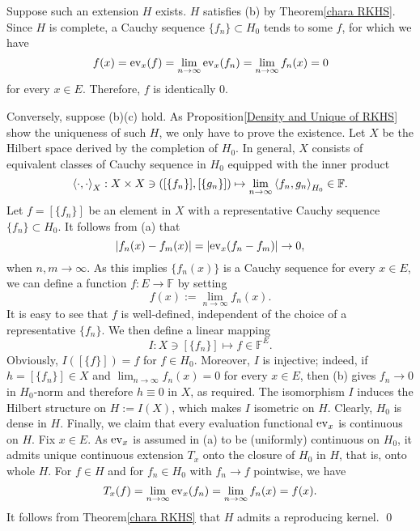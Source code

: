 \documentclass[a4paper,12pt]{article}
\begin{document}
\begin{prf}
	Suppose such an extension \( H \) exists. \( H \) satisfies (b) by Theorem\ref{chara RKHS}.
	Since \( H \) is complete, a Cauchy sequence \( \{f_n\} \subset H_0\) tends to some \( f \), for which we have
	\begin{equation*}
		f(x) = \mathrm{ev}_{x}(f) = \lim_{n \to \infty} \mathrm{ev}_{x}(f_n) = \lim_{n \to \infty} f_n(x) = 0
	\end{equation*}
	for every \( x \in E \). Therefore, \( f \) is identically 0.
	
	Conversely, suppose (b)(c) hold. As Proposition\ref{Density and Unique of RKHS} show the uniqueness of such \( H \), we only have to prove the existence.
	Let \( X \) be the Hilbert space derived by the completion of \( H_0 \).
	In general, \( X \) consists of equivalent classes of Cauchy sequence in \( H_0 \) equipped with the inner product
	\begin{equation*}
		\left<\cdot , \cdot  \right>_X : X \times X \ni \left( [\{f_n\}], [\{g_n\}] \right) \mapsto \lim_{n \to \infty} \left<f_n, g_n \right>_{H_0} \in \mathbb{F}.
	\end{equation*}
	Let \( f = [\{f_n\}] \) be an element in \( X \) with a representative Cauchy sequence \( \{f_n\} \subset H_0 \). It follows from (a) that
	\begin{equation*}
		\left| f_n(x)-f_m(x) \right| = \left| \mathrm{ev}_{x}(f_n-f_m) \right| \to 0,
	\end{equation*}
	when \( n,m \to \infty \).
	As this implies \( \{f_n(x)\} \) is a Cauchy sequence for every \( x \in E \), we can define a function \( f: E \to \mathbb{F} \) by setting
	\begin{equation*}
		f(x) := \lim_{n \to \infty} f_n(x).
	\end{equation*}
	It is easy to see that \( f \) is well-defined, independent of the choice of a representative \( \{f_n\} \). We then define a linear mapping
	\begin{equation*}
		I:X \ni [\{f_n\}] \mapsto f \in \mathbb{F}^E.
	\end{equation*}
	Obviously, \( I([\{f\}]) = f \) for \( f \in  H_0 \). Moreover,
	\( I \) is injective; indeed, if \( h = [\{f_n\}] \in X\) and \( \lim_{n \to \infty} f_n(x)=0 \) for every \( x \in E \), then (b) gives \( f_n \to 0 \) in \( H_0 \)-norm and therefore \( h \equiv 0 \) in \( X \), as required. The isomorphism \( I \) induces the Hilbert structure on \( H:= I(X)\), which makes \( I \) isometric on \( H \). Clearly, \( H_0 \) is dense in \( H \). Finally, we claim that every evaluation functional \( \mathrm{ev}_{x} \) is continuous on \( H \). Fix \( x \in E \). As \( \mathrm{ev}_{x} \) is assumed in (a) to be (uniformly) continuous on \( H_0 \), it admits unique continuous extension \( T_x \) onto the closure of \( H_0 \) in \( H \), that is, onto whole \( H \). For \( f \in H \) and for \( f_n \in H_0\) with \( f_n \to f \) pointwise, we have
	\begin{equation*}
		T_x(f) = \lim_{n \to \infty} \mathrm{ev}_{x}(f_n) = \lim_{n \to \infty}f_n(x) = f(x).
	\end{equation*}
	It follows from Theorem\ref{chara RKHS} that \( H \) admits a reproducing kernel.
	\qed\end{prf}
\end{document}
